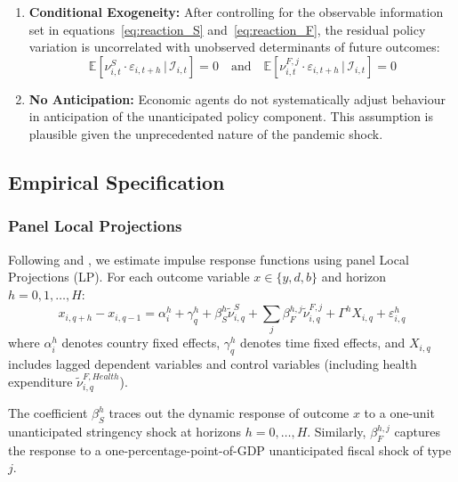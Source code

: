 \documentclass[12pt, a4paper]{article}
\begin{document}
\begin{enumerate}
    \item \textbf{Conditional Exogeneity:} After controlling for the observable information set in equations~\eqref{eq:reaction_S} and~\eqref{eq:reaction_F}, the residual policy variation is uncorrelated with unobserved determinants of future outcomes:
    \begin{equation}
        \mathbb{E}[\nu^S_{i,t} \cdot \varepsilon_{i,t+h} \,|\, \mathcal{I}_{i,t}] = 0 \quad \text{and} \quad \mathbb{E}[\nu^{F,j}_{i,t} \cdot \varepsilon_{i,t+h} \,|\, \mathcal{I}_{i,t}] = 0
    \end{equation}
    
    \item \textbf{No Anticipation:} Economic agents do not systematically adjust behaviour in anticipation of the unanticipated policy component. This assumption is plausible given the unprecedented nature of the pandemic shock.
\end{enumerate}

\subsection{Empirical Specification}

\subsubsection{Panel Local Projections}

Following \citet{jorda2005estimation} and \citet{jorda2025local}, we estimate impulse response functions using panel Local Projections (LP). For each outcome variable $x \in \{y, d, b\}$ and horizon $h = 0, 1, \ldots, H$:
\begin{equation}
    x_{i,q+h} - x_{i,q-1} = \alpha^h_i + \gamma^h_q + \beta^h_S \tilde{\nu}^S_{i,q} + \sum_{j} \beta^{h,j}_F \tilde{\nu}^{F,j}_{i,q} + \Gamma^h X_{i,q} + \varepsilon^h_{i,q}
    \label{eq:LP_baseline}
\end{equation}
where $\alpha^h_i$ denotes country fixed effects, $\gamma^h_q$ denotes time fixed effects, and $X_{i,q}$ includes lagged dependent variables and control variables (including health expenditure $\tilde{\nu}^{F,Health}_{i,q}$).

The coefficient $\beta^h_S$ traces out the dynamic response of outcome $x$ to a one-unit unanticipated stringency shock at horizons $h = 0, \ldots, H$. Similarly, $\beta^{h,j}_F$ captures the response to a one-percentage-point-of-GDP unanticipated fiscal shock of type $j$.
\end{document}
